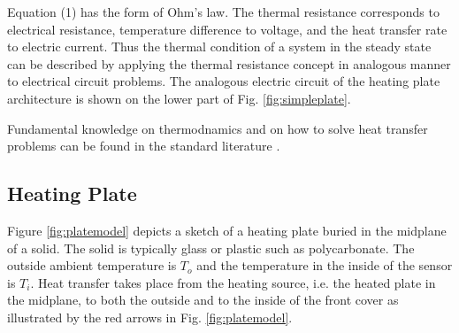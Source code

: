 Equation (1) has the form of Ohm's law. The thermal resistance corresponds to electrical resistance, temperature difference to voltage, and the heat transfer rate to electric current. Thus the thermal condition of a system in the steady state can be described by applying the thermal resistance concept in analogous manner to electrical circuit problems. The analogous electric circuit of the heating plate architecture is shown on the lower part of Fig. \ref{fig:simpleplate}. 

Fundamental knowledge on thermodnamics and on how to solve heat transfer problems can be found in the standard literature \cite{Cengel2002,Cengel2014}. 

\subsection{Heating Plate}\label{chapter:heatingplate}
Figure \ref{fig:platemodel} depicts a sketch of a heating plate buried in the midplane of a solid. The solid is typically glass or plastic such as polycarbonate. The outside ambient temperature is $T_o$ and the temperature in the inside of the sensor is $T_i$. Heat transfer takes place from the heating source, i.e. the heated plate in the midplane, to both the outside and to the inside of the front cover as illustrated by the red arrows in Fig. \ref{fig:platemodel}.  

